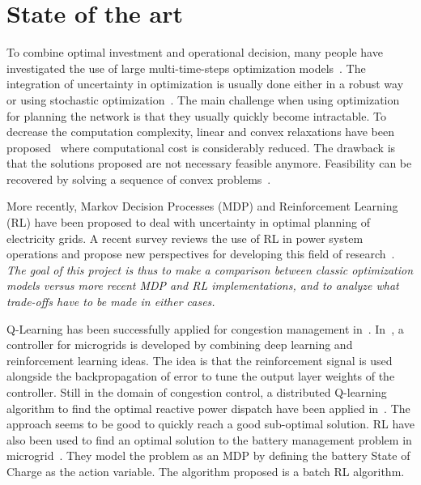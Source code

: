 \section{State of the art}
\label{sec:stateart}

To combine optimal investment and operational decision, many people have investigated the use of large multi-time-steps optimization models~\cite{zonal_int,Baker2012OptimalIO,paolone}.
The integration of uncertainty in optimization is usually done either in a robust way~\cite{LorcaSun,adaptative,BM2} or using stochastic optimization~\cite{Oren}.
The main challenge when using optimization for planning the network is that they usually quickly become intractable.
To decrease the computation complexity, linear and convex relaxations have been proposed~\cite{Farivar_Relax1,Farivar_Relax2,BM1} where computational cost is considerably reduced.
The drawback is that the solutions proposed are not necessary feasible anymore.
Feasibility can be recovered by solving a sequence of convex problems~\cite{Nali}.

More recently, Markov Decision Processes (MDP) and Reinforcement Learning (RL) have been proposed to deal with uncertainty in optimal planning of electricity grids.
A recent survey reviews the use of RL in power system operations and propose new perspectives for developing this field of research~\cite{RLSurvey}.
\emph{The goal of this project is thus to make a comparison between classic optimization
models versus more recent MDP and RL implementations, and to analyze what trade-offs
have to be made in either cases.}

Q-Learning has been successfully applied for congestion management in~\cite{ZARRABIAN2016179}.
In~\cite{fuzzy}, a controller for microgrids is developed by combining deep learning and reinforcement learning ideas.
The idea is that the reinforcement signal is used alongside the backpropagation of error to tune the output layer weights of the controller.
Still in the domain of congestion control, a distributed Q-learning algorithm to find the optimal reactive power dispatch have been applied in~\cite{volt_control}.
The approach seems to be good to quickly reach a good sub-optimal solution.
RL have also been used to find an optimal solution to the battery management problem in microgrid~\cite{Battery}.
They model the problem as an MDP by defining the battery State of Charge as the action variable.
The algorithm proposed is a batch RL algorithm.

